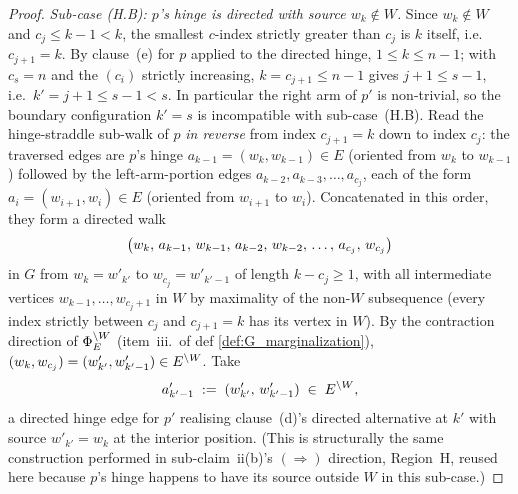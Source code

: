\documentclass[main]{subfiles}
\begin{document}
\begin{proof}
\emph{Sub-case (H.B): $p$'s hinge is directed with source $w_k \notin W$.}
Since $w_k \notin W$ and $c_j \le k - 1 < k$, the smallest $c$-index
strictly greater than $c_j$ is $k$ itself, i.e.\ $c_{j+1} = k$. By
clause~(e) for $p$ applied to the directed hinge, $1 \le k \le n - 1$;
with $c_s = n$ and the $(c_i)$ strictly increasing,
$k = c_{j+1} \le n - 1$ gives $j + 1 \le s - 1$, i.e.\
$k' = j + 1 \le s - 1 < s$. In particular the right arm of $p'$ is
non-trivial, so the boundary configuration $k' = s$ is incompatible with
sub-case~(H.B). Read the hinge-straddle sub-walk of $p$ \emph{in reverse}
from index $c_{j+1} = k$ down to index $c_j$: the traversed edges are
$p$'s hinge $a_{k - 1} = (w_k, w_{k - 1}) \in E$ (oriented from $w_k$ to
$w_{k - 1}$) followed by the left-arm-portion edges
$a_{k - 2}, a_{k - 3}, \dots, a_{c_j}$, each of the form
$a_i = (w_{i + 1}, w_i) \in E$ (oriented from $w_{i + 1}$ to $w_i$).
Concatenated in this order, they form a directed walk
\[
    \left ( w_k,\, a_{k - 1},\, w_{k - 1},\, a_{k - 2},\, w_{k - 2},\, \dots,\, a_{c_j},\, w_{c_j} \right )
\]
in $G$ from $w_k = w'_{k'}$ to $w_{c_j} = w'_{k' - 1}$ of length
$k - c_j \ge 1$, with all intermediate vertices
$w_{k - 1}, \dots, w_{c_j + 1}$ in $W$ by maximality of the non-$W$
subsequence (every index strictly between $c_j$ and $c_{j+1} = k$ has
its vertex in $W$). By the contraction direction of $\Phi_E^{\setminus W}$
(item~iii.\ of def \ref{def:G_marginalization}),
$(w_k, w_{c_j}) = (w'_{k'}, w'_{k' - 1}) \in E^{\setminus W}$. Take
\[
    a'_{k'-1} \;:=\; (w'_{k'},\, w'_{k'-1}) \;\in\; E^{\setminus W},
\]
a directed hinge edge for $p'$ realising clause~(d)'s directed
alternative at $k'$ with source $w'_{k'} = w_k$ at the interior
position. (This is structurally the same construction performed in
sub-claim~ii(b)'s $(\Rightarrow)$ direction, Region~H, reused here
because $p$'s hinge happens to have its source outside $W$ in this
sub-case.)


\end{proof}
\end{document}
